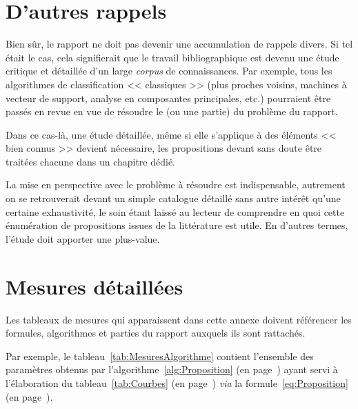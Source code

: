 \documentclass[11pt, french]{report-rd-info}
\begin{document}
\chapter{D'autres rappels}
\label{ann:RappelsInutiles}

Bien sûr, le rapport ne doit pas devenir une accumulation de rappels divers. Si tel était le cas, cela signifierait que le travail bibliographique est devenu une étude critique et détaillée d'un large \emph{corpus} de connaissances. Par exemple, tous les algorithmes de classification << classiques >> (plus proches voisins, machines à vecteur de support, analyse en composantes principales, etc.) pourraient être passés en revue en vue de résoudre le (ou une partie) du problème du rapport.

Dans ce cas-là, une étude détaillée, même si elle s'applique à des éléments << bien connus >> devient nécessaire, les propositions devant sans doute être traitées chacune dans un chapitre dédié.

La mise en perspective avec le problème à résoudre est indispensable, autrement on se retrouverait devant un simple catalogue détaillé sans autre intérêt qu'une certaine exhaustivité, le soin étant laissé au lecteur de comprendre en quoi cette énumération de propositions issues de la littérature est utile. En d'autres termes, l'étude doit apporter une plus-value.

\chapter{Mesures détaillées}
\label{ann:Mesures}

Les tableaux de mesures qui apparaissent dans cette annexe doivent référencer les formules, algorithmes et parties du rapport auxquels ils sont rattachés.

Par exemple, le tableau~\ref{tab:MesuresAlgorithme} contient l'ensemble des paramètres obtenus par l'algorithme~\ref{alg:Proposition} (en page~\pageref{alg:Proposition}) ayant servi à l'élaboration du tableau~\ref{tab:Courbes} (en page~\pageref{tab:Courbes}) \emph{via} la formule~\ref{eq:Proposition} (en page~\pageref{eq:Proposition}).
\end{document}
